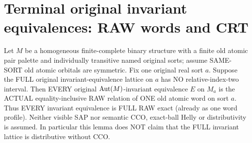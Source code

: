 \section{Terminal original invariant equivalences: RAW words and CRT}
\label{sec:foundational-terminal-invariant-exactness}

\begin{lemma}
\label{lem:typed-all-invariant-equivalences-raw-word}
Let $M$ be a homogeneous finite-complete binary
structure with a finite old atomic pair palette
and individually transitive named original sorts;
assume SAME-SORT old atomic orbitals are symmetric.
Fix one original real sort $a$. Suppose the FULL
original invariant-equivalence lattice on $a$
has NO relative-index-two interval. Then EVERY
original $\operatorname{Aut}(M)$-invariant equivalence $E$
on $M_a$ is the ACTUAL equality-inclusive RAW
relation of ONE old atomic word on sort $a$.
Thus EVERY invariant equivalence is FULL RAW
exact (already as one word profile). Neither
visible SAP nor semantic CCO, exact-ball Helly
or distributivity is assumed. In particular
this lemma does NOT claim that the FULL invariant
lattice is distributive without CCO.
\end{lemma}
